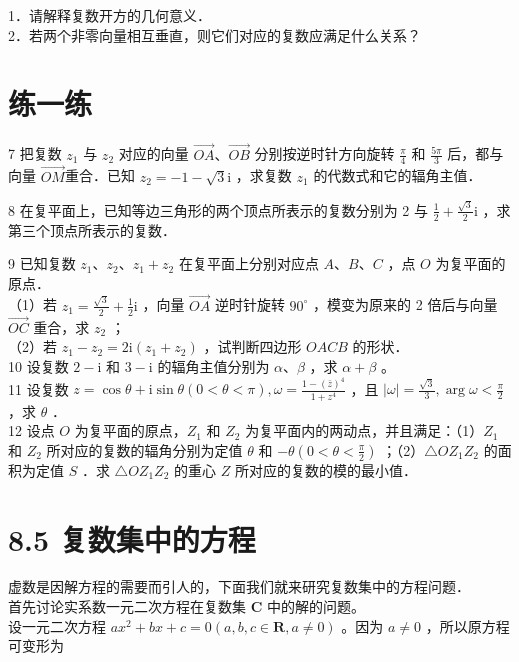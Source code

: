 \documentclass[10pt]{article}
\begin{document}
1．请解释复数开方的几何意义．\\
2．若两个非零向量相互垂直，则它们对应的复数应满足什么关系？

\section*{练一练}
7 把复数 \(z_{1}\) 与 \(z_{2}\) 对应的向量 \(\overrightarrow{O A} 、 \overrightarrow{O B}\) 分别按逆时针方向旋转 \(\frac{\pi}{4}\) 和 \(\frac{5 \pi}{3}\) 后，都与向量 \(\overrightarrow{O M}\)重合．已知 \(z_{2}=-1-\sqrt{3} \mathrm{i}\) ，求复数 \(z_{1}\) 的代数式和它的辐角主值．

8 在复平面上，已知等边三角形的两个顶点所表示的复数分别为 2 与 \(\frac{1}{2}+\frac{\sqrt{3}}{2} \mathrm{i}\) ，求第三个顶点所表示的复数．

9 已知复数 \(z_{1} 、 z_{2} 、 z_{1}+z_{2}\) 在复平面上分别对应点 \(A 、 B 、 C\) ，点 \(O\) 为复平面的原点．\\
（1）若 \(z_{1}=\frac{\sqrt{3}}{2}+\frac{1}{2} \mathrm{i}\) ，向量 \(\overrightarrow{O A}\) 逆时针旋转 \(90^{\circ}\) ，模变为原来的 2 倍后与向量 \(\overrightarrow{O C}\) 重合，求 \(z_{2}\) ；\\
（2）若 \(z_{1}-z_{2}=2 \mathrm{i}\left(z_{1}+z_{2}\right)\) ，试判断四边形 \(O A C B\) 的形状．\\
10 设复数 \(2-\mathrm{i}\) 和 \(3-\mathrm{i}\) 的辐角主值分别为 \(\alpha 、 \beta\) ，求 \(\alpha+\beta\) 。\\
11 设复数 \(z=\cos \theta+\mathrm{i} \sin \theta(0<\theta<\pi), \omega=\frac{1-(\bar{z})^{4}}{1+z^{4}}\) ，且 \(|\omega|=\frac{\sqrt{3}}{3}, \arg \omega<\frac{\pi}{2}\) ，求 \(\theta\) ．\\
12 设点 \(O\) 为复平面的原点，\(Z_{1}\) 和 \(Z_{2}\) 为复平面内的两动点，并且满足：（1）\(Z_{1}\) 和 \(Z_{2}\) 所对应的复数的辐角分别为定值 \(\theta\) 和 \(-\theta\left(0<\theta<\frac{\pi}{2}\right)\) ；（2）\(\triangle O Z_{1} Z_{2}\) 的面积为定值 \(S\) ．求 \(\triangle O Z_{1} Z_{2}\) 的重心 \(Z\) 所对应的复数的模的最小值．

\section*{8.5 复数集中的方程}
虚数是因解方程的需要而引人的，下面我们就来研究复数集中的方程问题．\\
首先讨论实系数一元二次方程在复数集 \(\mathbf{C}\) 中的解的问题。\\
设一元二次方程 \(a x^{2}+b x+c=0(a, b, c \in \mathbf{R}, a \neq 0)\) 。因为 \(a \neq 0\) ，所以原方程可变形为
\end{document}
